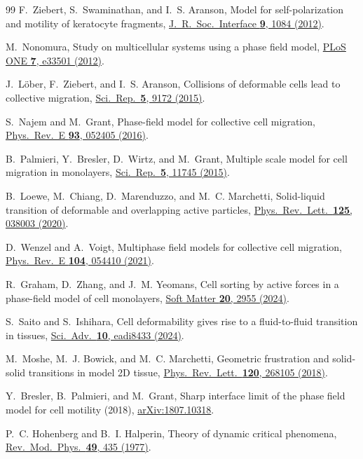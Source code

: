 \documentclass[aps,pre,twocolumn,superscriptaddress,longbibliography,floatfix]{revtex4-2}
\begin{document}
\begin{thebibliography}{99}
F.~Ziebert, S.~Swaminathan, and I.~S. Aranson,
Model for self-polarization and motility of keratocyte fragments,
\href{https://doi.org/10.1098/rsif.2011.0694}{J.\ R.\ Soc.\ Interface
\textbf{9}, 1084 (2012)}.

M.~Nonomura,
Study on multicellular systems using a phase field model,
\href{https://doi.org/10.1371/journal.pone.0033501}{PLoS ONE \textbf{7},
e33501 (2012)}.

J.~L\"ober, F.~Ziebert, and I.~S. Aranson,
Collisions of deformable cells lead to collective migration,
\href{https://doi.org/10.1038/srep09172}{Sci.\ Rep.\ \textbf{5}, 9172
(2015)}.

S.~Najem and M.~Grant,
Phase-field model for collective cell migration,
\href{https://doi.org/10.1103/PhysRevE.93.052405}{Phys.\ Rev.\ E
\textbf{93}, 052405 (2016)}.

B.~Palmieri, Y.~Bresler, D.~Wirtz, and M.~Grant,
Multiple scale model for cell migration in monolayers,
\href{https://doi.org/10.1038/srep11745}{Sci.\ Rep.\ \textbf{5}, 11745
(2015)}.

B.~Loewe, M.~Chiang, D.~Marenduzzo, and M.~C. Marchetti,
Solid-liquid transition of deformable and overlapping active particles,
\href{https://doi.org/10.1103/PhysRevLett.125.038003}{Phys.\ Rev.\ Lett.\
\textbf{125}, 038003 (2020)}.

D.~Wenzel and A.~Voigt,
Multiphase field models for collective cell migration,
\href{https://doi.org/10.1103/PhysRevE.104.054410}{Phys.\ Rev.\ E
\textbf{104}, 054410 (2021)}.

R.~Graham, D.~Zhang, and J.~M. Yeomans,
Cell sorting by active forces in a phase-field model of cell
monolayers,
\href{https://doi.org/10.1039/d3sm01033c}{Soft Matter \textbf{20}, 2955
(2024)}.

S.~Saito and S.~Ishihara,
Cell deformability gives rise to a fluid-to-fluid transition in tissues,
\href{https://doi.org/10.1126/sciadv.adi8433}{Sci.\ Adv.\ \textbf{10},
eadi8433 (2024)}.

M.~Moshe, M.~J. Bowick, and M.~C. Marchetti,
Geometric frustration and solid-solid transitions in model 2D tissue,
\href{https://doi.org/10.1103/PhysRevLett.120.268105}{Phys.\ Rev.\ Lett.\
\textbf{120}, 268105 (2018)}.

Y.~Bresler, B.~Palmieri, and M.~Grant,
Sharp interface limit of the phase field model for cell motility
(2018), \href{https://arxiv.org/abs/1807.10318}{arXiv:1807.10318}.

\bibitem{HohenbergHalperin1977}
P.~C. Hohenberg and B.~I. Halperin,
Theory of dynamic critical phenomena,
\href{https://doi.org/10.1103/RevModPhys.49.435}{Rev.\ Mod.\ Phys.\
\textbf{49}, 435 (1977)}.

\end{thebibliography}
\end{document}
